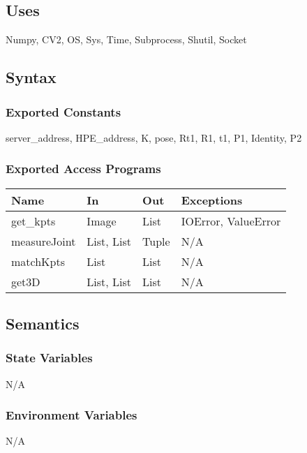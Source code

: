 \documentclass[12pt, titlepage]{article}
\begin{document}
\subsection{Uses}
Numpy, CV2, OS, Sys, Time, Subprocess, Shutil, Socket

\subsection{Syntax}

\subsubsection{Exported Constants}
server\_address, HPE\_address, K, pose, Rt1, R1, t1, P1, Identity, P2

\subsubsection{Exported Access Programs}
\begin{table}[h!]
  \centering
  \begin{tabular}{llll}
    \toprule
    \textbf{Name}       & \textbf{In}        & \textbf{Out}   & \textbf{Exceptions}      \\
    \midrule
    get\_kpts           & Image              & List           & IOError, ValueError      \\
    measureJoint        & List, List         & Tuple          & N/A                      \\
    matchKpts           & List               & List           & N/A                      \\
    get3D               & List, List         & List           & N/A                      \\
    \bottomrule
  \end{tabular}
\end{table}

\subsection{Semantics}

\subsubsection{State Variables}
N/A

\subsubsection{Environment Variables}
N/A
\end{document}
